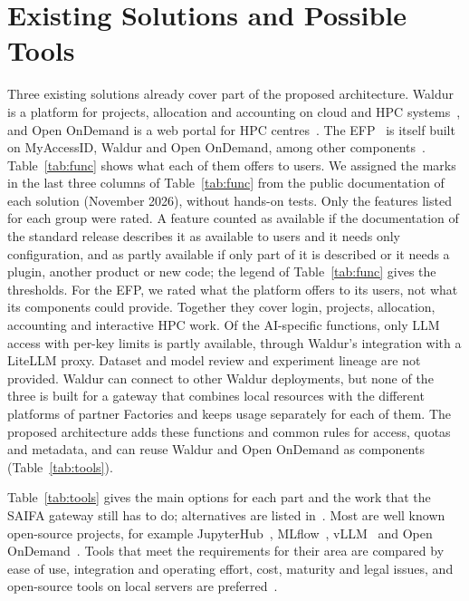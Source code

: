 \documentclass[conference,a4paper]{IEEEtran}
\newif\ifizmene
\DeclareRobustCommand{\chg}[1]{#1}
\DeclareRobustCommand{\roz}[1]{#1}
\DeclareRobustCommand{\nov}[1]{#1}
\DeclareRobustCommand{\tri}[1]{#1}
\DeclareRobustCommand{\fin}[1]{#1}
\DeclareRobustCommand{\pet}[1]{\ifizmene{\color{finalna}#1}\else#1\fi}
\begin{document}
\section{\chg{Existing Solutions and} Possible Tools}
\label{sec:tools}

\chg{Three existing solutions already cover part of the} \nov{proposed architecture}\roz{. Waldur is a platform for projects, allocation and accounting on cloud and HPC systems}~\cite{waldur_docs}\roz{, and Open OnDemand is a web portal for HPC centres}~\cite{hudak2018ood}. \roz{The EFP}~\cite{eurohpc_efp} \roz{is itself built on MyAccessID, Waldur and Open OnDemand}\nov{, among other components}~\cite{nortamo2025efp}. \roz{Table~\ref{tab:func} shows what each of them offers to users.} \nov{We assigned the marks \tri{in the last three columns of Table~\ref{tab:func}} from the public documentation of each solution (\fin{November} 2026), without hands-on tests.} \fin{Only the features listed for each group were rated. A feature counted as available if the documentation of the standard release describes it as available to users and it needs only configuration, and as partly available if only part of it is described or it needs a plugin, another product or new code; the legend of Table~\ref{tab:func} gives the thresholds.} \nov{For the EFP, we rated what the platform offers to its users, not what its components could provide.} \nov{Together they cover login, projects, allocation, accounting and interactive HPC work.} \nov{Of the AI-specific functions, only LLM access with per-key limits is partly available, \tri{through Waldur's integration with a LiteLLM proxy. Dataset} and model review and experiment lineage are not provided. Waldur can connect to other Waldur deployments, but none of the three is built for a gateway that combines local resources with the different platforms of partner Factories and keeps usage separately for each of them. The proposed architecture adds these functions and common rules for access, quotas and metadata\fin{, and can reuse Waldur and Open OnDemand as components (Table~\ref{tab:tools})}.}

Table~\ref{tab:tools} gives the main \roz{options} for each part and the work that \nov{the SAIFA} gateway still has to do\chg{; alternatives are listed in~\cite{saifa_d31}}. Most are well known open-source projects, for example JupyterHub~\cite{kluyver2016jupyter,jupyterhub_docs}, MLflow~\cite{zaharia2018mlflow}, vLLM~\cite{kwon2023vllm} and Open OnDemand~\cite{hudak2018ood}. \pet{Tools that meet the requirements for their area are} \nov{compared by ease of use, integration and operating effort, cost, maturity and legal issues, \tri{and open-source tools on local servers are preferred}~\cite{saifa_d31}}.
\end{document}
